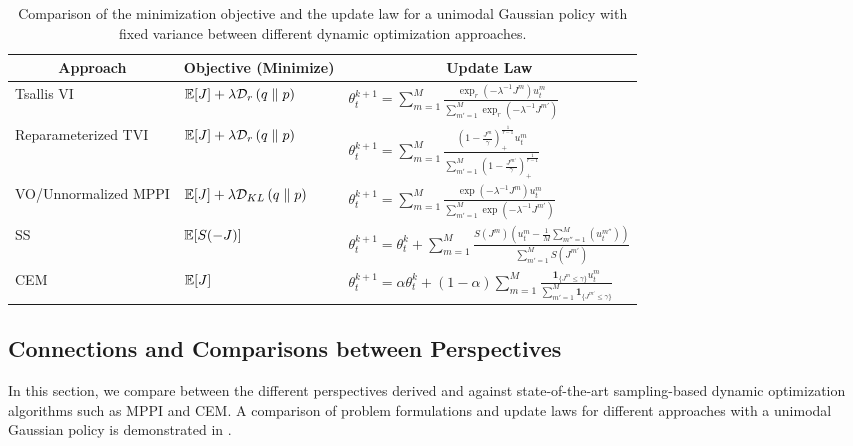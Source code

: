 \documentclass[twoside,11pt]{article}
\begin{document}
\bgroup
\begin{table}[t]
    \centering
    \caption{Comparison of the minimization objective and the update law for a unimodal Gaussian policy with fixed variance between different dynamic optimization approaches.}
    \begin{tabular}{@{} l l l @{}}
    \toprule
    \multicolumn{1}{c}{Approach} & \multicolumn{1}{c}{Objective (Minimize)} & \multicolumn{1}{c}{Update Law} \\
    \midrule
     Tsallis VI & $\mathbb{E}[J] + \lambda \mathcal{D}_{r}\left({q}\parallel {p}\right)$ & $\theta_t^{k+1} = \sum_{m=1}^M\frac{\exp_r \left(-\lambda^{-1}J^m\right) u^m_t }{\sum_{m'=1}^M \exp_r \left(-\lambda^{-1}J^{m'}\right)}$ \\
    \addlinespace[0.3em]
    Reparameterized TVI & $\mathbb{E}[J] + \lambda \mathcal{D}_{r}\left({q}\parallel {p}\right)$ & $\theta^{k+1}_t = \sum_{m=1}^M\frac{\left(1-\frac{J^m}{\gamma}\right)^{\frac{1}{r-1}}_+ u^m_t}{\sum_{m'=1}^M \left(1-\frac{J^{m'}}{\gamma}\right)^{\frac{1}{r-1}}_+}$\\
    \addlinespace[0.3em]
    VO/Unnormalized MPPI  & $\mathbb{E}[J] + \lambda \mathcal{D}_{KL}\left({q}\parallel {p}\right)$ & $\theta_t^{k+1} = \sum_{m=1}^M \frac{\exp \left(-\lambda^{-1}J^m\right) u^m_t }{\sum_{m'=1}^M \exp \left(-\lambda^{-1}J^{m'}\right)}$ \\
    \addlinespace[0.3em]
    SS & $\mathbb{E}[S(-J)]$ & $\theta_t^{k+1} = \theta_t^k + \sum_{m=1}^M\frac{S(J^m)  (u^m_t - \frac{1}{M}\sum_{m''=1}^M( u^{m''}_t)) }{\sum_{m'=1}^M S(J^{m'})}$ \\
    \addlinespace[0.5em]
    CEM & $\mathbb{E}[J]$ & $\theta_t^{k+1}=\alpha \theta_t^k + (1-\alpha) \sum_{m=1}^M \frac{\bm{1}_{ \{J^m\leq \gamma\} } u_t^m }{\sum_{m'=1}^M \bm{1}_{ \{J^{m'}\leq \gamma\} }}$\\
    \bottomrule
    \end{tabular}
    \label{tab: perspective_comparison}
\end{table}
\egroup

\subsection{Connections and Comparisons between Perspectives}
\label{sec: connections}
In this section, we compare between the different perspectives derived and against state-of-the-art sampling-based dynamic optimization algorithms such as \ac{MPPI} and \ac{CEM}. A comparison of problem formulations and update laws for different approaches with a unimodal Gaussian policy is demonstrated in .
\end{document}
